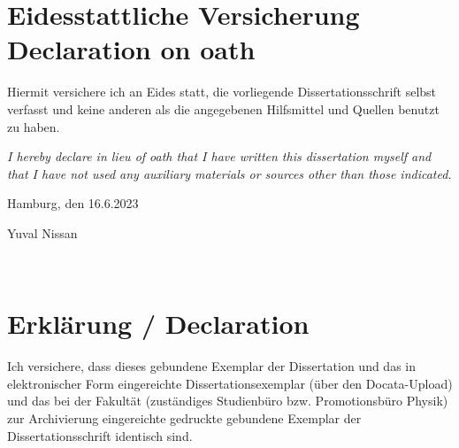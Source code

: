 \fancyhead{}
\renewcommand{\headrulewidth}{0pt}

\thispagestyle{plain}
\chapter*{Eidesstattliche Versicherung \\ Declaration on oath}

Hiermit versichere ich an Eides statt, die vorliegende Dissertationsschrift selbst verfasst und
keine anderen als die angegebenen Hilfsmittel und Quellen benutzt zu haben.

\emph{I hereby declare in lieu of oath that I have written this dissertation myself and that I have not used any auxiliary materials or sources other than those indicated.}


\vspace{1cm}

Hamburg, den 16.6.2023

\vspace{3cm}

\hspace{8cm} \hdashrule{7cm}{1pt}{1pt}

\vspace{0.1cm}

\hspace{10.2cm} Yuval Nissan


\clearpage
\thispagestyle{plain}
\newpage
\thispagestyle{plain}
\mbox{~}
\clearpage
\thispagestyle{plain}
\newpage
\thispagestyle{plain}


\chapter*{Erkl\"arung / Declaration}

Ich versichere, dass dieses gebundene Exemplar der Dissertation und das in elektronischer Form eingereichte Dissertationsexemplar (\"uber den Docata-Upload) und das bei der Fakult\"at (zust\"andiges Studienb\"uro bzw. Promotionsb\"uro Physik) zur Archivierung eingereichte gedruckte gebundene Exemplar der Dissertationsschrift identisch sind.

